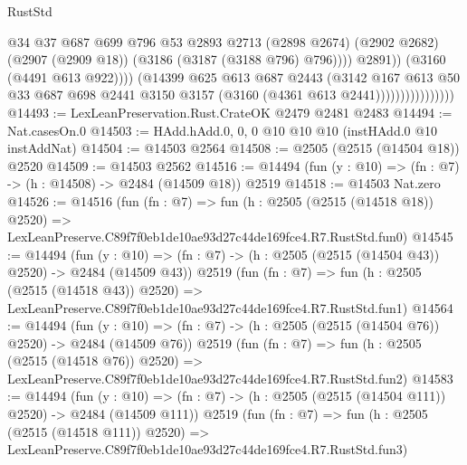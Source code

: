\begin{lexlean}{RustStd}
\begin{coremodule}
                                        @34
                                        @37
                                        @687
                                        @699
                                        @796
                                        @53
                                        @2893
                                        @2713
                                        (@2898 @2674)
                                        (@2902 @2682)
                                        (@2907 (@2909 @18))
                                        (@3186 (@3187 (@3188 @796) @796))))
                                    @2891))
                                (@3160 (@4491 @613 @922))))
                            (@14399
                              @625
                              @613
                              @687
                              @2443
                              (@3142
                                @167
                                @613
                                @50
                                @33
                                @687
                                @698
                                @2441
                                @3150
                                @3157
                                (@3160 (@4361 @613 @2441))))))))))))))))
@14493 := LexLeanPreservation.Rust.CrateOK @2479 @2481 @2483
@14494 := Nat.casesOn.{0}
@14503 := HAdd.hAdd.{0, 0, 0} @10 @10 @10 (instHAdd.{0} @10 instAddNat)
@14504 := @14503 @2564
@14508 := @2505 (@2515 (@14504 @18)) @2520
@14509 := @14503 @2562
@14516 := @14494 (fun (y : @10) => (fn : @7) -> (h : @14508) -> @2484 (@14509 @18)) @2519
@14518 := @14503 Nat.zero
@14526 := @14516
    (fun (fn : @7) =>
    fun (h : @2505 (@2515 (@14518 @18)) @2520) =>
    LexLeanPreserve.C89f7f0eb1de10ae93d27c44de169fce4.R7.RustStd.fun0)
@14545 := @14494
    (fun (y : @10) => (fn : @7) -> (h : @2505 (@2515 (@14504 @43)) @2520) -> @2484 (@14509 @43))
    @2519
    (fun (fn : @7) =>
    fun (h : @2505 (@2515 (@14518 @43)) @2520) =>
    LexLeanPreserve.C89f7f0eb1de10ae93d27c44de169fce4.R7.RustStd.fun1)
@14564 := @14494
    (fun (y : @10) => (fn : @7) -> (h : @2505 (@2515 (@14504 @76)) @2520) -> @2484 (@14509 @76))
    @2519
    (fun (fn : @7) =>
    fun (h : @2505 (@2515 (@14518 @76)) @2520) =>
    LexLeanPreserve.C89f7f0eb1de10ae93d27c44de169fce4.R7.RustStd.fun2)
@14583 := @14494
    (fun (y : @10) => (fn : @7) -> (h : @2505 (@2515 (@14504 @111)) @2520) -> @2484 (@14509 @111))
    @2519
    (fun (fn : @7) =>
    fun (h : @2505 (@2515 (@14518 @111)) @2520) =>
    LexLeanPreserve.C89f7f0eb1de10ae93d27c44de169fce4.R7.RustStd.fun3)

\end{coremodule}
\end{lexlean}

